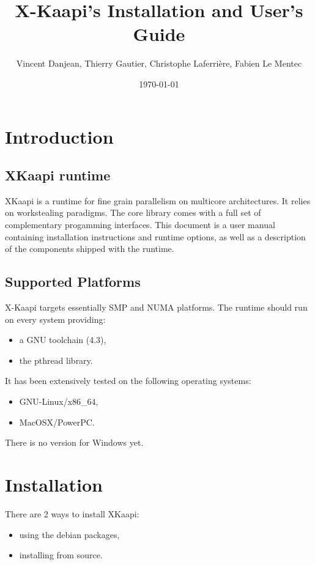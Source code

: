 \documentclass{article}
\newcommand{\kaapi}{\textsc{X}-Kaapi\xspace}
\begin{document}
\title{X-Kaapi's Installation and User's Guide}
\author{Vincent Danjean, Thierry Gautier, Christophe Laferrière, Fabien Le Mentec}
\date{\today}
\maketitle
\tableofcontents
\newpage

\section{Introduction}

\subsection{XKaapi runtime}
XKaapi is a runtime for fine grain parallelism on multicore architectures.
It relies on workstealing paradigms.
The core library comes with a full set of complementary progamming interfaces.
This document is a user manual containing installation instructions and runtime
options, as well as a description of the components shipped with the runtime.

\subsection{Supported Platforms}
\kaapi targets essentially SMP and NUMA platforms. The runtime should run
on every system providing:
\begin{itemize}
\item a GNU toolchain (4.3),
\item the pthread library.
\end{itemize}
It has been extensively tested on the following operating systems:
\begin{itemize}
\item GNU-Linux/x86\_64,
\item MacOSX/PowerPC.
\end{itemize}
There is no version for Windows yet.

\section{Installation}

There are 2 ways to install XKaapi:
\begin{itemize}
\item using the debian packages,
\item installing from source.
\end{itemize}
\end{document}
